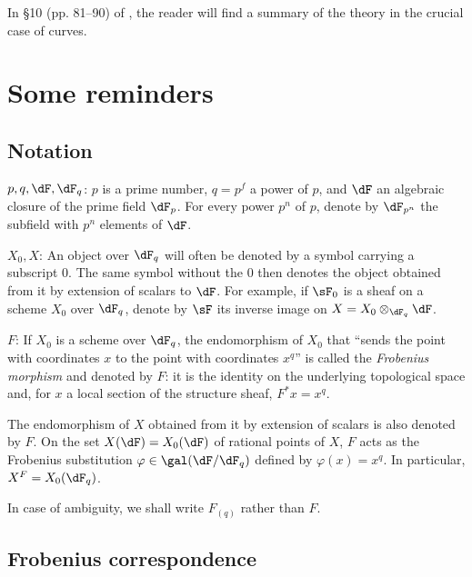 \documentclass[oneside]{book}
\begin{document}
In \S 10 (pp. 81--90) of \cite{de73}, the reader will find a summary of the
theory in the crucial case of curves.










\section{Some reminders}\label{II:1}





\subsection{Notation}\label{II:1-1}

$p,q,\dF,\dF_q$: $p$ is a prime number, $q=p^f$ a power of $p$, and $\dF$
an algebraic closure of the prime field $\dF_p$. For every power $p^n$ of
$p$, denote by $\dF_{p^n}$ the subfield with $p^n$ elements of $\dF$.

$X_0,X$: An object over $\dF_q$ will often be denoted by a symbol carrying a
subscript $0$. The same symbol without the $0$ then denotes the object
obtained from it by extension of scalars to $\dF$. For example, if $\sF_0$ is
a sheaf on a scheme $X_0$ over $\dF_q$, denote by $\sF$ its inverse image on
$X=X_0\otimes_{\dF_q} \dF$.

$F$: If $X_0$ is a scheme over $\dF_q$, the endomorphism of $X_0$ that
``sends the point with coordinates $x$ to the point with coordinates $x^q$''
is called the \emph{Frobenius morphism} and denoted by $F$: it is the identity
on the underlying topological space and, for $x$ a local section of the
structure sheaf, $F^* x = x^q$.

The endomorphism of $X$ obtained from it by extension of scalars is also
denoted by $F$. On the set $X(\dF) = X_0(\dF)$ of rational points of $X$,
$F$ acts as the Frobenius substitution
$\varphi\in\gal(\dF/\dF_q)$ defined by $\varphi(x)=x^q$. In particular,
$X^F=X_0(\dF_q)$.

In case of ambiguity, we shall write $F_{(q)}$ rather than $F$.










\subsection{Frobenius correspondence}\label{II:1-2}
\end{document}
